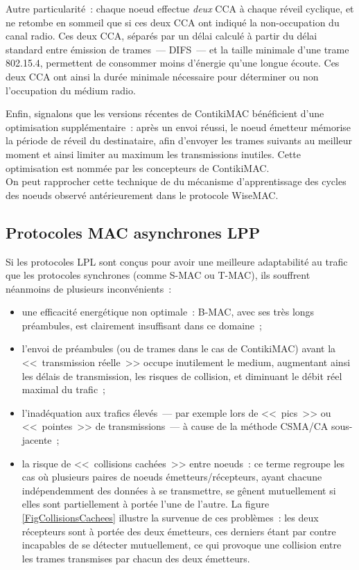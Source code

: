 Autre particularité~: chaque noeud effectue \emph{deux} CCA à chaque réveil
cyclique, et ne retombe en sommeil que si ces deux CCA ont indiqué
la non-occupation du canal radio. Ces deux CCA, séparés par un délai
calculé à partir du délai standard entre émission de trames~--- DIFS~---
et la taille minimale d'une trame 802.15.4, permettent de consommer
moins d'énergie qu'une longue écoute. Ces deux CCA ont ainsi la durée
minimale nécessaire pour déterminer ou non l'occupation du médium radio.

Enfin, signalons que les versions récentes de ContikiMAC bénéficient d'une
optimisation supplémentaire~: après un envoi réussi, le noeud émetteur
mémorise la période de réveil du destinataire, afin d'envoyer les
trames suivants au meilleur moment et ainsi limiter au maximum
les transmissions inutiles. Cette optimisation est nommée  par les concepteurs de ContikiMAC. \\
On peut rapprocher cette technique de  du mécanisme
d'apprentissage des cycles des noeuds observé antérieurement dans le
protocole WiseMAC.


\subsection{Protocoles MAC asynchrones LPP}
\label{SubsecProtoMACLPP}

Si les protocoles LPL sont conçus pour avoir une meilleure adaptabilité
au trafic que les protocoles synchrones (comme S-MAC ou T-MAC),
ils souffrent néanmoins de plusieurs inconvénients~:
\begin{itemize}
\item une efficacité energétique non optimale~: B-MAC, avec ses très longs
préambules, est clairement insuffisant dans ce domaine~;
\item l'envoi de préambules (ou de trames dans le cas de ContikiMAC)
avant la <<~transmission réelle~>> occupe inutilement le medium,
augmentant ainsi les délais de transmission, les risques de collision,
et diminuant le débit réel maximal du trafic~;
\item l'inadéquation aux trafics élevés~--- par exemple lors de <<~pics~>>
ou <<~pointes~>> de transmissions~--- à cause de la méthode CSMA/CA
sous-jacente~;
\item la risque de <<~collisions cachées~>> entre noeuds~: ce terme
regroupe les cas où plusieurs paires de noeuds émetteurs/récepteurs,
ayant chacune indépendemment des données à se transmettre, se gênent
mutuellement si elles sont partiellement à portée l'une de l'autre.
La figure \vref{FigCollisionsCachees} illustre la survenue
de ces problèmes~: les deux récepteurs sont à portée des deux
émetteurs, ces derniers étant par contre incapables de se détecter
mutuellement, ce qui provoque une collision entre les trames transmises
par chacun des deux émetteurs.
\end{itemize}


